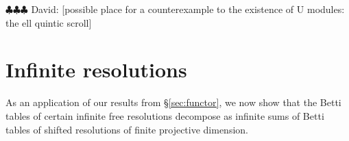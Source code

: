 \documentclass[12pt]{amsart}
\theoremstyle{definition}
\theoremstyle{remark}
\newcommand{\FF}{\mathbf{F}}
\newcommand{\david}[1]{{\color{red} \sf $\clubsuit\clubsuit\clubsuit$ David: [#1]}}
\begin{document}
\david{possible place for a counterexample to the existence of U modules: the ell quintic scroll}


\section{Infinite resolutions}\label{sec:infinite}
As an application of our results from \S\ref{sec:functor}, we now show that the Betti tables of certain infinite free resolutions decompose as infinite sums of Betti tables of shifted resolutions of finite projective dimension.
%
\end{document}
